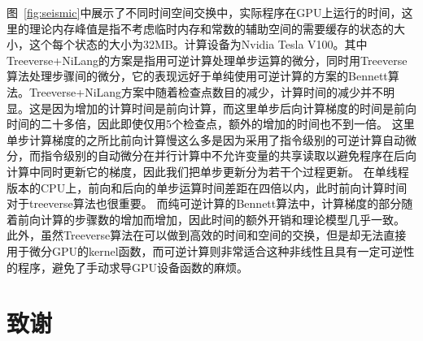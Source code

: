 \documentclass[A4,twoside,fontset=ubuntu,UTF8]{ctexart}
\begin{document}
图~\ref{fig:seismic}中展示了不同时间空间交换中，实际程序在GPU上运行的时间，这里的理论内存峰值是指不考虑临时内存和常数的辅助空间的需要缓存的状态的大小，这个每个状态的大小为32MB。计算设备为Nvidia Tesla V100。其中Treeverse+NiLang的方案是指用可逆计算处理单步运算的微分，同时用Treeverse算法处理步骤间的微分，它的表现远好于单纯使用可逆计算的方案的Bennett算法。Treeverse+NiLang方案中随着检查点数目的减少，计算时间的减少并不明显。这是因为增加的计算时间是前向计算，而这里单步后向计算梯度的时间是前向时间的二十多倍，因此即使仅用5个检查点，额外的增加的时间也不到一倍。
这里单步计算梯度的之所比前向计算慢这么多是因为采用了指令级别的可逆计算自动微分，而指令级别的自动微分在并行计算中不允许变量的共享读取以避免程序在后向计算中同时更新它的梯度，因此我们把单步更新分为若干个过程更新。
在单线程版本的CPU上，前向和后向的单步运算时间差距在四倍以内，此时前向计算时间对于treeverse算法也很重要。
而纯可逆计算的Bennett算法中，计算梯度的部分随着前向计算的步骤数的增加而增加，因此时间的额外开销和理论模型几乎一致。
此外，虽然Treeverse算法在可以做到高效的时间和空间的交换，但是却无法直接用于微分GPU的kernel函数，而可逆计算则非常适合这种非线性且具有一定可逆性的程序，避免了手动求导GPU设备函数的麻烦。

\section*{致谢}
\end{document}
